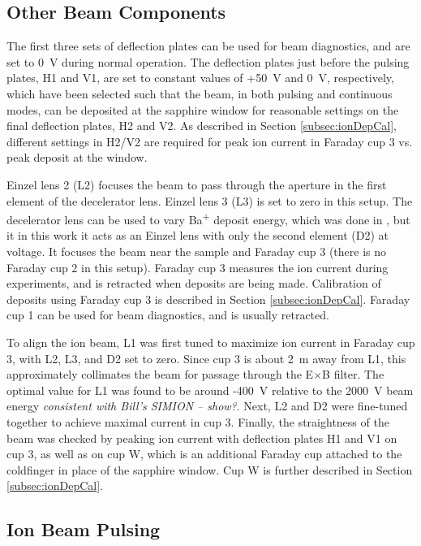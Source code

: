 \subsection{Other Beam Components}

The first three sets of deflection plates can be used for beam diagnostics, and are set to 0~V during normal operation.  The deflection plates just before the pulsing plates, H1 and V1, are set to constant values of +50~V and 0~V, respectively, which have been selected such that the beam, in both pulsing and continuous modes, can be deposited at the sapphire window for reasonable settings on the final deflection plates, H2 and V2.  As described in Section \ref{subsec:ionDepCal}, different settings in H2/V2 are required for peak ion current in Faraday cup 3 vs. peak deposit at the window.

Einzel lens 2 (L2) focuses the beam to pass through the aperture in the first element of the decelerator lens.  Einzel lens 3 (L3) is set to zero in this setup.  The decelerator lens can be used to vary Ba\textsuperscript{+} deposit energy, which was done in \cite{Shon}, but it in this work it acts as an Einzel lens with only the second element (D2) at voltage.  It focuses the beam near the sample and Faraday cup 3 (there is no Faraday cup 2 in this setup).  Faraday cup 3 measures the ion current during experiments, and is retracted when deposits are being made.  Calibration of deposits using Faraday cup 3 is described in Section \ref{subsec:ionDepCal}.  Faraday cup 1 can be used for beam diagnostics, and is usually retracted.  

To align the ion beam, L1 was first tuned to maximize ion current in Faraday cup 3, with L2, L3, and D2 set to zero.  Since cup 3 is about 2~m away from L1, this approximately collimates the beam for passage through the E$\times$B filter.  The optimal value for L1 was found to be around -400~V relative to the 2000~V beam energy \emph{\color{gray}consistent with Bill's SIMION -- show?}.  Next, L2 and D2 were fine-tuned together to achieve maximal current in cup 3.  Finally, the straightness of the beam was checked by peaking ion current with deflection plates H1 and V1 on cup 3, as well as on cup W, which is an additional Faraday cup attached to the coldfinger in place of the sapphire window.  Cup W is further described in Section \ref{subsec:ionDepCal}.


\subsection{Ion Beam Pulsing}

